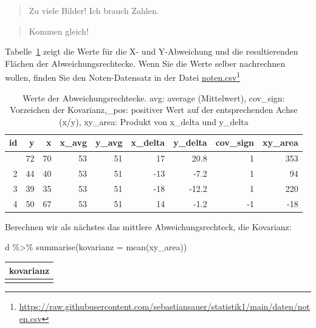 \documentclass[
  a4paper,
]{scrbook}
\newenvironment{Shaded}{\begin{snugshade}}{\end{snugshade}}
\newcommand{\AttributeTok}[1]{\textcolor[rgb]{0.40,0.45,0.13}{#1}}
\newcommand{\FunctionTok}[1]{\textcolor[rgb]{0.28,0.35,0.67}{#1}}
\newcommand{\NormalTok}[1]{\textcolor[rgb]{0.00,0.23,0.31}{#1}}
\newcommand{\SpecialCharTok}[1]{\textcolor[rgb]{0.37,0.37,0.37}{#1}}
\theoremstyle{definition}
\theoremstyle{definition}
\theoremstyle{definition}
\theoremstyle{remark}
\begin{document}
\begin{quote}
{} Zu viele Bilder! Ich brauch Zahlen.
\end{quote}

\begin{quote}
{} Kommen gleich!
\end{quote}

Tabelle~\ref{tbl-kov2} zeigt die Werte für die X- und Y-Abweichung und
die resultierenden Flächen der Abweichungsrechtecke. Wenn Sie die Werte
selber nachrechnen wollen, finden Sie den Noten-Datensatz in der Datei
\href{https://raw.githubusercontent.com/sebastiansauer/statistik1/main/daten/noten.csv}{noten.csv}\footnote{\url{https://raw.githubusercontent.com/sebastiansauer/statistik1/main/daten/noten.csv}}

\begin{longtable}[]{@{}rrrrrrrrr@{}}

\caption{\label{tbl-kov2}Werte der Abweichungsrechtecke. avg: average
(Mittelwert), cov\_sign: Vorzeichen der Kovarianz,\_pos: positiver Wert
auf der entsprechenden Achse (x/y), xy\_area: Produkt von x\_delta und
y\_delta}

\tabularnewline

\toprule\noalign{}
id & y & x & x\_avg & y\_avg & x\_delta & y\_delta & cov\_sign &
xy\_area \\
\midrule\noalign{}
\endhead
\bottomrule\noalign{}
\endlastfoot
1 & 72 & 70 & 53 & 51 & 17 & 20.8 & 1 & 353 \\
2 & 44 & 40 & 53 & 51 & -13 & -7.2 & 1 & 94 \\
3 & 39 & 35 & 53 & 51 & -18 & -12.2 & 1 & 220 \\
4 & 50 & 67 & 53 & 51 & 14 & -1.2 & -1 & -18 \\

\end{longtable}

Berechnen wir als nächstes das mittlere Abweichungsrechteck, die
Kovarianz:

\begin{Shaded}
\begin{Highlighting}[]
\NormalTok{d }\SpecialCharTok{\%\textgreater{}\%}
  \FunctionTok{summarise}\NormalTok{(}\AttributeTok{kovarianz =} \FunctionTok{mean}\NormalTok{(xy\_area))}
\end{Highlighting}
\end{Shaded}

\begin{longtable}[]{@{}r@{}}
\toprule\noalign{}
kovarianz \\
\midrule\noalign{}
\endhead
\bottomrule\noalign{}
\endlastfoot
162.5 \\
\end{longtable}
\end{document}
